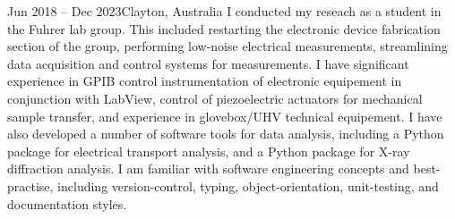 \documentclass[10pt,a4paper,ragged2e,withhyper]{altacv}
\begin{document}
		\divider
		\newpage

		{Jun 2018 -- Dec 2023}{Clayton, Australia}
		I conducted my reseach as a student in the Fuhrer lab group. This included restarting the electronic device fabrication section of the group,
		performing low-noise electrical measurements, streamlining data acquisition and control systems for measurements. I have significant experience in GPIB control instrumentation of
		electronic equipement in conjunction with LabView, control of piezoelectric actuators for mechanical sample transfer, and experience in glovebox/UHV technical equipement.
		I have also developed a number of software tools for data analysis, including a Python package for electrical transport analysis, and a Python package for X-ray diffraction analysis.
		I am familiar with software engineering concepts and best-practise, including version-control, typing, object-orientation, unit-testing, and documentation styles.

		
\end{document}
